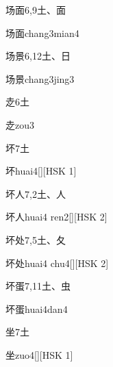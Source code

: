 \begin{entry}{场面}{6,9}{⼟、⾯}
  \begin{phonetics}{场面}{chang3mian4}
  \end{phonetics}
\end{entry}

\begin{entry}{场景}{6,12}{⼟、⽇}
  \begin{phonetics}{场景}{chang3jing3}
  \end{phonetics}
\end{entry}

\begin{entry}{赱}{6}{⼟}
  \begin{phonetics}{赱}{zou3}
  \end{phonetics}
\end{entry}

\begin{entry}{坏}{7}{⼟}
  \begin{phonetics}{坏}{huai4}[][HSK 1]
  \end{phonetics}
\end{entry}

\begin{entry}{坏人}{7,2}{⼟、⼈}
  \begin{phonetics}{坏人}{huai4 ren2}[][HSK 2]
  \end{phonetics}
\end{entry}

\begin{entry}{坏处}{7,5}{⼟、⼡}
  \begin{phonetics}{坏处}{huai4 chu4}[][HSK 2]
  \end{phonetics}
\end{entry}

\begin{entry}{坏蛋}{7,11}{⼟、⾍}
  \begin{phonetics}{坏蛋}{huai4dan4}
  \end{phonetics}
\end{entry}

\begin{entry}{坐}{7}{⼟}
  \begin{phonetics}{坐}{zuo4}[][HSK 1]
  \end{phonetics}
\end{entry}

